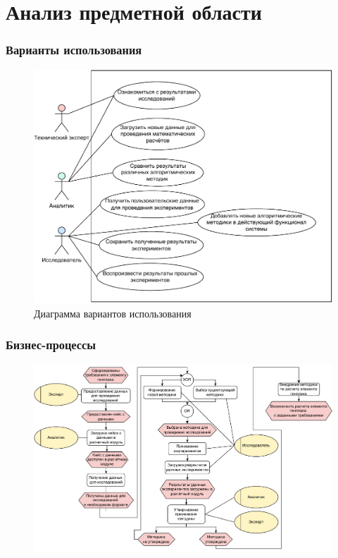 \section{Анализ предметной области}

\begin{frame}
\frametitle{Варианты использования}
\begin{figure}
    \includegraphics[scale=.48]{pictures/usecase}
    \caption{Диаграмма вариантов использования}
\end{figure}
\end{frame}

\begin{frame}
\frametitle{Бизнес-процессы}
\begin{figure}
    \includegraphics[scale=.48]{pictures/common_epc}
\end{figure}
\end{frame}

